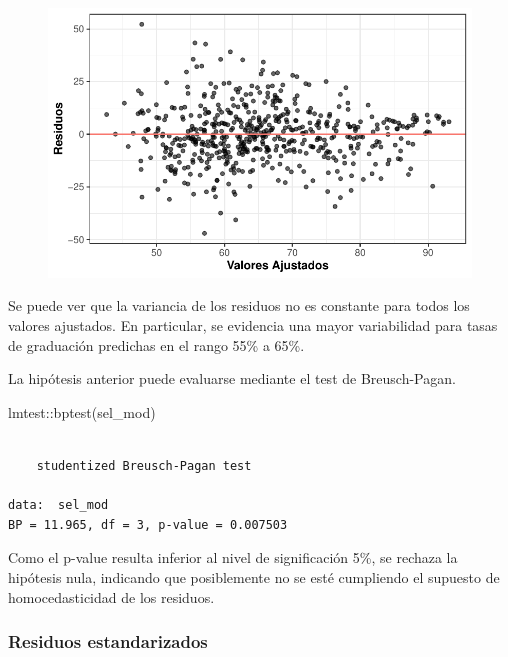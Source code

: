 \documentclass[
  letterpaper,
  DIV=11,
  numbers=noendperiod]{scrartcl}
\newenvironment{Shaded}{\begin{snugshade}}{\end{snugshade}}
\newcommand{\FunctionTok}[1]{\textcolor[rgb]{0.28,0.35,0.67}{#1}}
\newcommand{\NormalTok}[1]{\textcolor[rgb]{0.00,0.23,0.31}{#1}}
\newcommand{\SpecialCharTok}[1]{\textcolor[rgb]{0.37,0.37,0.37}{#1}}
\begin{document}
\begin{figure}[H]

{\centering \includegraphics{TP_final_files/figure-pdf/unnamed-chunk-29-1.pdf}

}

\end{figure}

Se puede ver que la variancia de los residuos no es constante para todos
los valores ajustados. En particular, se evidencia una mayor
variabilidad para tasas de graduación predichas en el rango 55\% a 65\%.

La hipótesis anterior puede evaluarse mediante el test de Breusch-Pagan.

\begin{Shaded}
\begin{Highlighting}[]
\NormalTok{lmtest}\SpecialCharTok{::}\FunctionTok{bptest}\NormalTok{(sel\_mod)}
\end{Highlighting}
\end{Shaded}

\begin{verbatim}

    studentized Breusch-Pagan test

data:  sel_mod
BP = 11.965, df = 3, p-value = 0.007503
\end{verbatim}

Como el p-value resulta inferior al nivel de significación 5\%, se
rechaza la hipótesis nula, indicando que posiblemente no se esté
cumpliendo el supuesto de homocedasticidad de los residuos.

\hypertarget{residuos-estandarizados}{%
\subsubsection{Residuos estandarizados}\label{residuos-estandarizados}}
\end{document}
